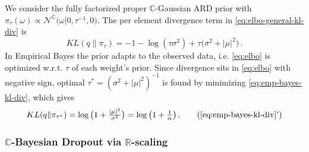 \documentclass[a4paper,10pt,onecolumn]{article}
\newcommand{\real}{\mathbb{R}}
\newcommand{\cplx}{\mathbb{C}}
\newcommand{\tr}[1]{\mathop{tr}{#1}}
\newcommand{\hop}{{\mkern-1.5mu\dagger}}
\begin{document}
We consider the fully factorized proper $\cplx$-Gaussian ARD prior with $
  \pi_\tau(\omega)
    \propto \mathcal{N}^{\cplx}\bigl(
      \omega \vert 0, \tau^{-1}, 0
    \bigr)
$. The per element divergence term in \eqref{eq:elbo-general-kl-div} is
\begin{equation}  \label{eq:emp-bayes-kl-div}
  KL(q \| \pi_\tau)
    = - 1 - \log{(\tau \sigma^2)}
      + \tau \bigl(
        \sigma^2 + \lvert \mu \rvert^2
      \bigr)
    \,.
\end{equation}
%
%
In Empirical Bayes the prior adapts to the observed data, i.e. \eqref{eq:elbo} is optimized
w.r.t. $\tau$ of each weight's prior. Since divergence sits in \eqref{eq:elbo} with negative
sign, optimal $
  \tau^\ast = (\sigma^2 + \lvert \mu \rvert^2)^{-1}
$ is found by minimizing \eqref{eq:emp-bayes-kl-div}, which gives
\begin{equation}  \label{eq:emp-bayes-opt-kl}
  KL(q \| \pi_{\tau^\ast})
    = \log{\bigl(1 + \tfrac{\lvert \mu \rvert^2}{\sigma^2}\bigr)}
    = \log{\bigl(1 + \tfrac1\alpha \bigr)}
    \,.
    \tag{\ref{eq:emp-bayes-kl-div}'}
\end{equation}


\subsubsection{$\cplx$-Bayesian Dropout via $\real$-scaling} %
\label{ssub:real_scaling_dropout}
\end{document}
